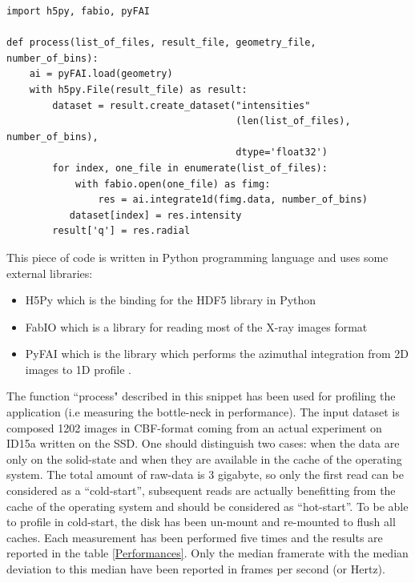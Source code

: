 \documentclass[preprint]{iucr}              %
\begin{document}
\begin{minipage}{\linewidth}
\label{snippet}
\label{sequential}
\begin{verbatim}
import h5py, fabio, pyFAI

def process(list_of_files, result_file, geometry_file, number_of_bins):
    ai = pyFAI.load(geometry)
    with h5py.File(result_file) as result:
        dataset = result.create_dataset("intensities"
                                        (len(list_of_files), number_of_bins),
                                        dtype='float32') 
        for index, one_file in enumerate(list_of_files):
            with fabio.open(one_file) as fimg:
                res = ai.integrate1d(fimg.data, number_of_bins)
           dataset[index] = res.intensity
        result['q'] = res.radial
\end{verbatim}
\end{minipage}

This piece of code is written in Python \cite{python} programming language and
uses some external libraries:
\begin{itemize}
  \item {H5Py} which is the binding for the HDF5 library in Python \cite{h5py}
  \item{FabIO} which is a library for reading most of the X-ray images format
  \cite{fabio}
  \item{PyFAI} which is the library which performs the azimuthal
  integration from 2D images to 1D profile \cite{pyFAI}. 
\end{itemize}

The function ``process" described in this snippet has been used for
profiling the application (i.e measuring the bottle-neck in performance). 
The input dataset is composed 1202 images in CBF-format coming from an actual
experiment on ID15a written on the SSD.
One should distinguish two cases: when the data are only on the
solid-state and when they are available in the cache of the
operating system.
The total amount of raw-data is 3 gigabyte, so only the first read can be
considered as a ``cold-start'', subsequent reads are actually benefitting from
the cache of the operating system and should be considered as ``hot-start''.
To be able to profile in cold-start, the disk has been un-mount and re-mounted
to flush all caches.
Each measurement has been performed five times and the results are reported in
the table \ref{Performances}.  Only the median framerate  with the median
deviation to this median have been reported in frames per second (or Hertz).
\end{document}
